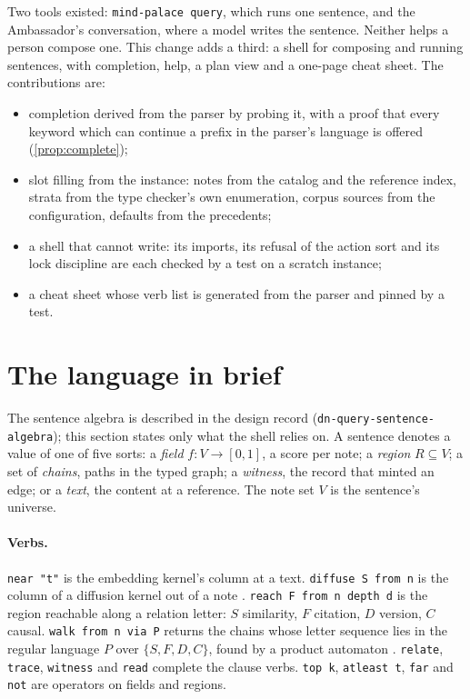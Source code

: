 \documentclass[11pt]{article}
\theoremstyle{plain}
\theoremstyle{definition}
\theoremstyle{remark}
\newcommand{\code}[1]{\texttt{#1}}
\begin{document}
Two tools existed: \code{mind-palace query}, which runs one sentence, and the Ambassador's
conversation, where a model writes the sentence. Neither helps a person compose one. This change
adds a third: a shell for composing and running sentences, with completion, help, a plan view and
a one-page cheat sheet. The contributions are:
\begin{itemize}
\item completion derived from the parser by probing it, with a proof that every keyword which can
  continue a prefix in the parser's language is offered (\cref{prop:complete});
\item slot filling from the instance: notes from the catalog and the reference index, strata from
  the type checker's own enumeration, corpus sources from the configuration, defaults from the
  precedents;
\item a shell that cannot write: its imports, its refusal of the action sort and its lock
  discipline are each checked by a test on a scratch instance;
\item a cheat sheet whose verb list is generated from the parser and pinned by a test.
\end{itemize}

\section{The language in brief}
The sentence algebra is described in the design record (\code{dn-query-sentence-algebra}); this
section states only what the shell relies on. A sentence denotes a value of one of five sorts: a
\emph{field} $f : V \to [0,1]$, a score per note; a \emph{region} $R \subseteq V$; a set of
\emph{chains}, paths in the typed graph; a \emph{witness}, the record that minted an edge; or a
\emph{text}, the content at a reference. The note set $V$ is the sentence's universe.

\paragraph{Verbs.} \code{near "t"} is the embedding kernel's column at a text.
\code{diffuse S from n} is the column of a diffusion kernel out of a note
\cite{kondor2002diffusion}. \code{reach F from n depth d} is the region reachable along a relation
letter: $S$ similarity, $F$ citation, $D$ version, $C$ causal. \code{walk from n via P} returns the
chains whose letter sequence lies in the regular language $P$ over $\{S,F,D,C\}$, found by a
product automaton \cite{mendelzon1995regular,hopcroft2006automata}. \code{relate}, \code{trace},
\code{witness} and \code{read} complete the clause verbs. \code{top k}, \code{atleast t},
\code{far} and \code{not} are operators on fields and regions.
\end{document}
